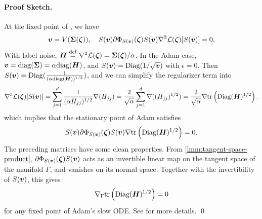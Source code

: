 
\paragraph{Proof Sketch.}
At the fixed point of , we have
$${\bm{v}} = V({\bm{\Sigma}}({\bm{\zeta}})), \quad S({\bm{v}})  \partial\Phi_{S({\bm{v}})}({\bm{\zeta}}) S({\bm{v}}) \nabla^3 \mathcal{L}({\bm{\zeta}}) [S({\bm{v}})]=0.$$
With label noise, ${\bm{H}}\overset{\mathrm{def}}{=}\nabla^2\mathcal{L}({\bm{\zeta}})={\bm{\Sigma}}({\bm{\zeta}})/\alpha$. In the Adam case, ${\bm{v}} = \mathrm{diag}({\bm{\Sigma}}) = \alpha\mathrm{diag}({\bm{H}})$, and $S({\bm{v}}) =\mathrm{Diag}(1/\sqrt{{\bm{v}}})$ with $\epsilon = 0$. 
Then $S({\bm{v}}) = \mathrm{Diag}(\frac{1}{(\alpha\mathrm{diag}({\bm{H}}))^{1/2}})$, and we can simplify the regularizer term into 
\begin{align*}
    \nabla^3 \mathcal{L} ({\bm{\zeta}})[S({\bm{v}})] = \sum_{j=1}^{d} \frac{1}{(\alpha H_{jj})^{1/2}} \nabla(H_{jj}) = \frac{2}{\sqrt{\alpha}} \sum_{j=1}^{d} \nabla ((H_{jj})^{1/2}) = \frac{2}{\sqrt{\alpha}} \nabla \text{tr}\left(\mathrm{Diag}({\bm{H}})^{1/2}\right).
\end{align*}
which implies that the stationary point of Adam satisfies 
\begin{align*}
    S({\bm{v}})  \partial\Phi_{S({\bm{v}})}({\bm{\zeta}}) S({\bm{v}}) \nabla \text{tr}\left(\mathrm{Diag}({\bm{H}})^{1/2}\right)=0.
\end{align*}
The preceding matrices have some clean properties. From \cref{lmm:tangent-space-product}, $\partial\Phi_{S({\bm{v}})}({\bm{\zeta}}) S({\bm{v}})$ acts as an invertible linear map on the tangent space of the manifold $\Gamma$, and vanishes on its normal space. Together with the invertibility of $S({\bm{v}})$, this gives
$$\nabla_{\Gamma} \text{tr}\left(\mathrm{Diag}({\bm{H}})^{1/2}\right) = 0 $$
for any fixed point of Adam's slow ODE. See  for more details. 
\qed

